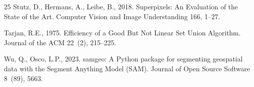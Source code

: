 \documentclass[review,11pt,authoryear]{elsarticle}
\begin{document}
\begin{thebibliography}{25}
Stutz, D., Hermans, A., Leibe, B., 2018. Superpixels: An Evaluation of the State of the Art. Computer Vision and Image Understanding 166, 1--27.

Tarjan, R.E., 1975. Efficiency of a Good But Not Linear Set Union Algorithm. Journal of the ACM 22~(2), 215--225.

Wu, Q., Osco, L.P., 2023. samgeo: A Python package for segmenting geospatial data with the Segment Anything Model (SAM). Journal of Open Source Software 8~(89), 5663.

\end{thebibliography}
\end{document}
